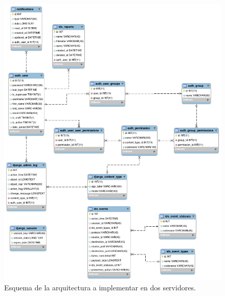 \begin{figure}
	\centering
	\includegraphics[scale=.4]{images/er_console_diagram}
	\caption{Esquema de la arquitectura a implementar en dos servidores.}
	\label{fig:ids_doos}
\end{figure}
